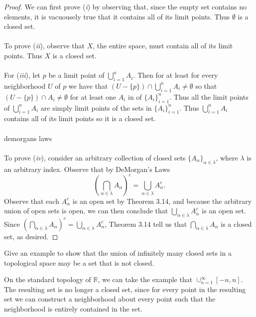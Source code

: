 \documentclass[letterpaper,12pt,twoside]{maths}
\begin{document}
\begin{proof}
    We can first prove (\textit{i}) by observing that, since the empty
    set contains no elements, it is vacuousely true that it contains
    all of its limit points. Thus $\emptyset$ is a closed set. \\
    \\
    To prove (\textit{ii}), observe that $X$, 
    the entire space, must contain all of its limit points. Thus
    $X$ is a closed set. \\
    \\
    For (\textit{iii}), let $p$ be a limit point of $\bigcup\limits_{i = 1}^n
    A_i$. Then for at least for every neighborhood $U$ of $p$ we
    have that $(U - \{p\}) \cap \bigcup\limits_{i = 1}^n A_i \ne \emptyset$ so that 
    $(U - \{p\})\cap A_i \ne \emptyset$ for at least one $A_i$ 
    in of $\{A_i\}_{i = 1}^n$. Thus all the limit points of
    $\bigcup\limits_{i = 1}^n
    A_i$ are simply limit points of the sets in $\{A_i\}_{i = 1}^n$.
    Thus $\bigcup\limits_{i = 1}^n A_i$ contains all of its limit points so
    it is a closed set.
    \\
    \\
    demorgans laws \\
    \\
    To prove (\textit{iv}), consider an arbitrary collection of closed
    sets $\{A_\alpha\}_{\alpha \in \lambda}$, where $\lambda$ is an
    arbitrary index. Observe that by DeMorgan's Laws
    \[
        \left(\bigcap\limits_{\alpha \in \lambda} A_\alpha\right)^c
        = \bigcup\limits_{\alpha \in \lambda} A_\alpha^c.
    \]
    Observe that each $A_\alpha^c$ is an open set by Theorem 3.14, and
    because the arbitrary union of open sets is open, we can then
    conclude that $\bigcup\limits_{\alpha \in \lambda} A_\alpha^c$ 
    is an open set. Since $\left(\bigcap\limits_{\alpha \in \lambda} A_\alpha\right)^c
    = \bigcup\limits_{\alpha \in \lambda} A_\alpha^c$, 
    Theorem 3.14 tell us
    that $\bigcap\limits_{\alpha \in \lambda} A_\alpha$ is a closed
    set, as desired.
\end{proof}


\noindent
\begin{exercise}[Exercise 3.17] Give an example to show that the union of
infinitely many closed sets in a topological space may be a set that
is not closed.
\end{exercise}

\begin{solution}
On the standard topology of $\mathbb{R}$, we can take the example that
$\cup_{n=1}^\infty [-n, n]$. The resulting set is no longer a closed
set, since for every point in the resulting set we can construct a
neighborhood about every point such that the neighborhood is entirely
contained in the set. 
\end{solution}
\end{document}
